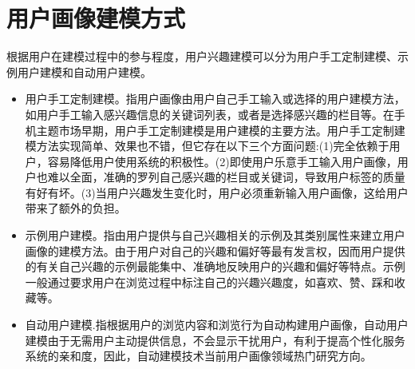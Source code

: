     \section{用户画像建模方式}
    根据用户在建模过程中的参与程度，用户兴趣建模可以分为用户手工定制建模、示例用户建模和自动用户建模。
    \begin{itemize}
    \item 用户手工定制建模。指用户画像由用户自己手工输入或选择的用户建模方法，如用户手工输入感兴趣信息的关键词列表，或者是选择感兴趣的栏目等。在手机主题市场早期，用户手工定制建模是用户建模的主要方法。用户手工定制建模方法实现简单、效果也不错，但它存在以下三个方面问题:(1)完全依赖于用户，容易降低用户使用系统的积极性。(2)即使用户乐意手工输入用户画像，用户也难以全面，准确的罗列自己感兴趣的栏目或关键词，导致用户标签的质量有好有坏。(3)当用户兴趣发生变化时，用户必须重新输入用户画像，这给用户带来了额外的负担。
    \item 示例用户建模。指由用户提供与自己兴趣相关的示例及其类别属性来建立用户画像的建模方法。由于用户对自己的兴趣和偏好等最有发言权，因而用户提供的有关自己兴趣的示例最能集中、准确地反映用户的兴趣和偏好等特点。示例一般通过要求用户在浏览过程中标注自己的兴趣兴趣度，如喜欢、赞、踩和收藏等。
    \item 自动用户建模.指根据用户的浏览内容和浏览行为自动构建用户画像，自动用户建模由于无需用户主动提供信息，不会显示干扰用户，有利于提高个性化服务系统的亲和度，因此，自动建模技术当前用户画像领域热门研究方向。
    \end{itemize}

